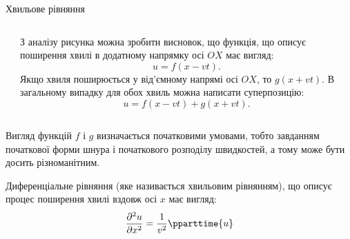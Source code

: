 \documentclass[onlytextwidth]{beamer}
\begin{document}
\begin{frame}{Хвильове рівняння}{}
\begin{columns}
	\begin{column}{0.5\linewidth}\centering
        
	\end{column}
	\begin{column}{0.5\linewidth}
        \begin{block}{}\justifying
            З аналізу рисунка можна зробити висновок, що функція, що описує поширення хвилі в додатному напрямку осі $OX$ має вигляд:
        \begin{equation*}
            u = f(x- vt).
        \end{equation*}
        Якщо хвиля поширюється у від'ємному напрямі осі $OX$, то $g(x + vt)$. В загальному випадку для обох хвиль можна написати суперпозицію:
        \begin{equation*}
            u = f(x - vt) +g(x + vt).
        \end{equation*}
        \end{block}
	\end{column}
\end{columns}
	\begin{block}{}\justifying
        Вигляд функцій $f$ і $g$ визначається початковими умовами, тобто завданням початкової форми шнура і початкового розподілу швидкостей,
        а тому може бути досить різноманітним.

        \medskip

		Диференціальне рівняння (яке називається \alert{хвильовим рівнянням}), що описує процес поширення хвилі вздовж осі $x$ має вигляд:
		\begin{equation*}
			\frac{\partial^2 u}{\partial x^2} = \frac1{v^2}\pparttime{u}
		\end{equation*}
	\end{block}


\end{frame}
\end{document}
